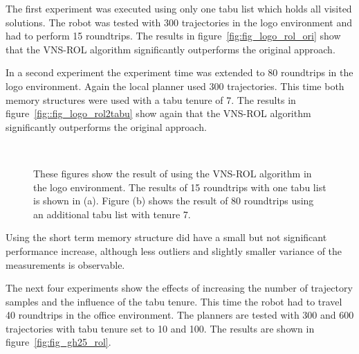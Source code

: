 The first experiment was executed using only one tabu list which holds all visited solutions. 
The robot was tested with 300 trajectories in the logo environment and had to perform 15 roundtrips.
The results in figure~\ref{fig:fig_logo_rol_ori} show that the VNS-ROL algorithm significantly outperforms the original approach. 

In a second experiment the experiment time was extended to 80 roundtrips in the logo environment.
Again the local planner used 300 trajectories.
This time both memory structures were used with a tabu tenure of 7.
The results in figure~\ref{fig::fig_logo_rol2tabu} show again that the VNS-ROL algorithm significantly outperforms the original approach. 

\begin{figure}[thpb]
   \myfloatalign
    \tiny
    \centering
    \\
    {
    \captionsetup[subfigure]{labelformat=empty} 
    }

    \caption[Experiment: VNS-ROL logo]{These figures show the result of using the VNS-ROL algorithm in the logo environment.
    The results of 15 roundtrips with one tabu list is shown in (a).  Figure (b) shows the result of 80 roundtrips using an additional tabu list with tenure 7.}  
     \label{fig:fig_logo_rol}
\end{figure} 

Using the short term memory structure did have a small but not significant performance increase, although less outliers and slightly smaller variance of the measurements is observable.  

The next four experiments show the effects of increasing the number of trajectory samples and the influence of the tabu tenure.
This time the robot had to travel 40 roundtrips in the office environment. The planners are tested with 300 and 600 trajectories with tabu tenure set to 10 and 100.
The results are shown in figure~\ref{fig:fig_gh25_rol}.
 
